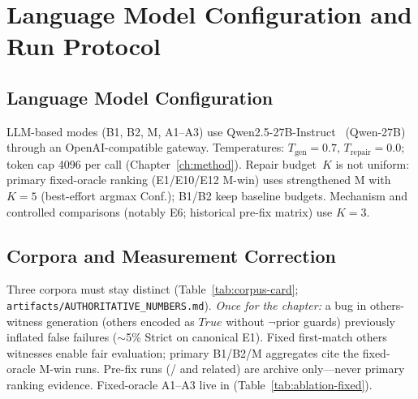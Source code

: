 \section{Language Model Configuration and Run Protocol}
\label{sec:exp:protocol}

\subsection{Language Model Configuration}

LLM-based modes (B1, B2, M, A1--A3) use
Qwen2.5-27B-Instruct~\citep{yang2024qwen25} (\textsf{Qwen-27B}) through an
OpenAI-compatible gateway.
Temperatures: $T_\text{gen}{=}0.7$, $T_\text{repair}{=}0.0$; token cap 4096
per call (Chapter~\ref{ch:method}).
Repair budget~$K$ is not uniform: primary fixed-oracle ranking
(E1/E10/E12 M-win) uses strengthened M with $K{=}5$ (best-effort argmax
Conf.); B1/B2 keep baseline budgets.
Mechanism and controlled comparisons (notably E6; historical pre-fix
matrix) use $K{=}3$.

\subsection{Corpora and Measurement Correction}

Three corpora must stay distinct (Table~\ref{tab:corpus-card};
\texttt{artifacts/AUTHORITATIVE\_NUMBERS.md}).
\emph{Once for the chapter:} a bug in others-witness generation
(others encoded as $\mathit{True}$ without $\neg$prior guards) previously
inflated false failures (${\sim}$5\% Strict on canonical E1).
Fixed first-match others witnesses enable fair evaluation; primary B1/B2/M
aggregates cite the fixed-oracle M-win runs.
Pre-fix runs (/
 and related) are archive only---never
primary ranking evidence.
Fixed-oracle A1--A3 live in 
(Table~\ref{tab:ablation-fixed}).

